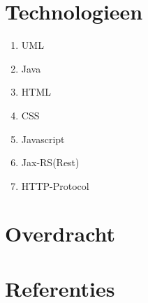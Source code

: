 \documentclass{article}
\begin{document}
\section{Technologieen}
\begin{enumerate}
    \item UML
    \item Java 
    \item HTML 
    \item CSS 
    \item Javascript 
    \item Jax-RS(Rest)
    \item HTTP-Protocol 
\end{enumerate}

\section{Overdracht}
\section{Referenties}
\end{document}
